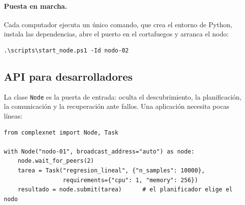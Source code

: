 \paragraph{Puesta en marcha.}
Cada computador ejecuta un único comando, que crea el entorno de Python, instala las dependencias,
abre el puerto en el cortafuegos y arranca el nodo:

\begin{verbatim}
.\scripts\start_node.ps1 -Id nodo-02
\end{verbatim}

\subsection{API para desarrolladores}

La clase \texttt{Node} es la puerta de entrada: oculta el descubrimiento, la planificación, la
comunicación y la recuperación ante fallos. Una aplicación necesita pocas líneas:

\begin{verbatim}
from complexnet import Node, Task

with Node("nodo-01", broadcast_address="auto") as node:
    node.wait_for_peers(2)
    tarea = Task("regresion_lineal", {"n_samples": 10000},
                 requirements={"cpu": 1, "memory": 256})
    resultado = node.submit(tarea)      # el planificador elige el nodo
\end{verbatim}

